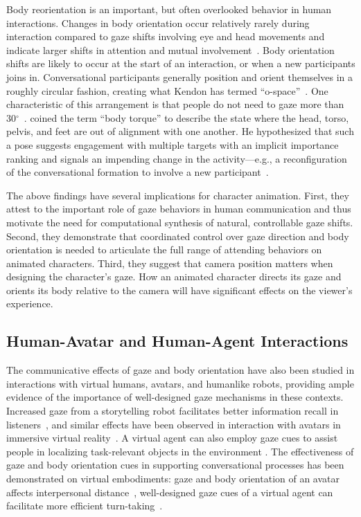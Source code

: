 Body reorientation is an important, but often overlooked behavior in human interactions. Changes in body orientation occur relatively rarely during interaction compared to gaze shifts involving eye and head movements and indicate larger shifts in attention and mutual involvement~\citep{kendon1990conducting,schegloff1998bodytorque}.
Body orientation shifts are likely to occur at the start of an interaction, or when a new participants joins in. Conversational participants generally position and orient themselves in a roughly circular fashion, creating what Kendon has termed ``o-space''~\citep{kendon1990conducting}. One characteristic of this arrangement is that people do not need to gaze more than 30$^{\circ}$~\citep{kendon1990conducting}. \citet{schegloff1998bodytorque} coined the term ``body torque'' to describe the state where the head, torso, pelvis, and feet are out of alignment with one another. He hypothesized that such a pose suggests engagement with multiple targets with an implicit importance ranking and signals an impending change in the activity---e.g., a reconfiguration of the conversational formation to involve a new participant~\citep{kendon1990conducting}.

The above findings have several implications for character animation. First, they attest to the important role of gaze behaviors in human communication and thus motivate the need for computational synthesis of natural, controllable gaze shifts. Second, they demonstrate that coordinated control over gaze direction and body orientation is needed to articulate the full range of attending behaviors on animated characters. Third, they suggest that camera position matters when designing the character's gaze. How an animated character directs its gaze and orients its body relative to the camera will have significant effects on the viewer's experience.

\subsection{Human-Avatar and Human-Agent Interactions}

The communicative effects of gaze and body orientation have also been studied in interactions with virtual humans, avatars, and humanlike robots, providing ample evidence of the importance of well-designed gaze mechanisms in these contexts. Increased gaze from a storytelling robot facilitates better information recall in listeners~\citep{mutlu2006storytelling}, and similar effects have been observed in interaction with avatars in immersive virtual reality~\citep{bailenson2005transformed}. A virtual agent can also employ gaze cues to assist people in localizing task-relevant objects in the environment \cite{bailly2010gaze}. The effectiveness of gaze and body orientation cues in supporting conversational processes has been demonstrated on virtual embodiments: gaze and body orientation of an avatar affects interpersonal distance~\citep{bailenson2003interpersonal}, well-designed gaze cues of a virtual agent can facilitate more efficient turn-taking~\citep{heylen2005experimenting,andrist2013aversion}.

